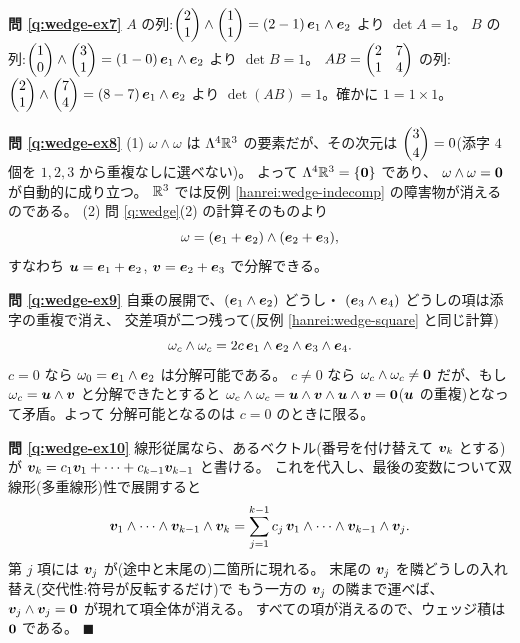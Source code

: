 \bigskip
\noindent\textbf{問 \ref{q:wedge-ex7}}\quad
$A$ の列:$\begin{pmatrix}2 \\ 1\end{pmatrix} \wedge \begin{pmatrix}1 \\ 1\end{pmatrix} = (2 - 1)\,
\bm{e}_1 \wedge \bm{e}_2$ より $\det A = 1$。
$B$ の列:$\begin{pmatrix}1 \\ 0\end{pmatrix} \wedge \begin{pmatrix}3 \\ 1\end{pmatrix} = (1 - 0)\,
\bm{e}_1 \wedge \bm{e}_2$ より $\det B = 1$。
$AB = \begin{pmatrix}2 & 7 \\ 1 & 4\end{pmatrix}$ の列:
$\begin{pmatrix}2 \\ 1\end{pmatrix} \wedge \begin{pmatrix}7 \\ 4\end{pmatrix} = (8 - 7)\,\bm{e}_1 \wedge \bm{e}_2$
より $\det(AB) = 1$。確かに $1 = 1 \times 1$。

\bigskip
\noindent\textbf{問 \ref{q:wedge-ex8}}\quad
(1) $\omega \wedge \omega$ は $\Lambda^4 \mathbb{R}^3$ の要素だが、その次元は
$\dbinom{3}{4} = 0$(添字 $4$ 個を $1, 2, 3$ から重複なしに選べない)。
よって $\Lambda^4 \mathbb{R}^3 = \{\bm{0}\}$ であり、
$\omega \wedge \omega = \bm{0}$ が自動的に成り立つ。
$\mathbb{R}^3$ では反例 \ref{hanrei:wedge-indecomp} の障害物が消えるのである。
(2) 問 \ref{q:wedge}(2) の計算そのものより
\[
\omega = (\bm{e}_1 + \bm{e}_2) \wedge (\bm{e}_2 + \bm{e}_3),
\]
すなわち $\bm{u} = \bm{e}_1 + \bm{e}_2$,
$\bm{v} = \bm{e}_2 + \bm{e}_3$ で分解できる。

\bigskip
\noindent\textbf{問 \ref{q:wedge-ex9}}\quad
自乗の展開で、$(\bm{e}_1 \wedge \bm{e}_2)$ どうし・
$(\bm{e}_3 \wedge \bm{e}_4)$ どうしの項は添字の重複で消え、
交差項が二つ残って(反例 \ref{hanrei:wedge-square} と同じ計算)
\[
\omega_c \wedge \omega_c = 2c\,\bm{e}_1 \wedge \bm{e}_2 \wedge
\bm{e}_3 \wedge \bm{e}_4.
\]
$c = 0$ なら $\omega_0 = \bm{e}_1 \wedge \bm{e}_2$ は分解可能である。
$c \neq 0$ なら $\omega_c \wedge \omega_c \neq \bm{0}$ だが、もし
$\omega_c = \bm{u} \wedge \bm{v}$ と分解できたとすると
$\omega_c \wedge \omega_c = \bm{u} \wedge \bm{v} \wedge \bm{u}
\wedge \bm{v} = \bm{0}$($\bm{u}$ の重複)となって矛盾。よって
分解可能となるのは $c = 0$ のときに限る。

\bigskip
\noindent\textbf{問 \ref{q:wedge-ex10}}\quad
線形従属なら、あるベクトル(番号を付け替えて $\bm{v}_k$ とする)が
$\bm{v}_k = c_1\bm{v}_1 + \cdots + c_{k-1}\bm{v}_{k-1}$ と書ける。
これを代入し、最後の変数について双線形(多重線形)性で展開すると
\[
\bm{v}_1 \wedge \cdots \wedge \bm{v}_{k-1} \wedge \bm{v}_k
= \sum_{j=1}^{k-1} c_j\,\bm{v}_1 \wedge \cdots \wedge \bm{v}_{k-1}
\wedge \bm{v}_j.
\]
第 $j$ 項には $\bm{v}_j$ が(途中と末尾の)二箇所に現れる。
末尾の $\bm{v}_j$ を隣どうしの入れ替え(交代性:符号が反転するだけ)で
もう一方の $\bm{v}_j$ の隣まで運べば、
$\bm{v}_j \wedge \bm{v}_j = \bm{0}$ が現れて項全体が消える。
すべての項が消えるので、ウェッジ積は $\bm{0}$ である。 $\blacksquare$

